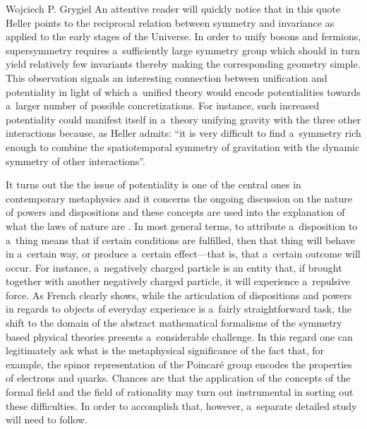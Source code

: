 \begin{artengenv}{Wojciech P. Grygiel}
An attentive reader will quickly notice that in this quote Heller points to the reciprocal relation between symmetry and invariance as applied to the early stages of the Universe. In order to unify bosons and fermions, supersymmetry requires a~sufficiently large symmetry group which should in turn yield relatively few invariants thereby making the corresponding geometry simple. This observation signals an interesting connection between unification and potentiality in light of which a~unified theory would encode potentialities towards a~larger number of possible concretizations. For instance, such increased potentiality could manifest itself in a~theory unifying gravity with the three other interactions because, as Heller 
\parencite*[][p.63]{heller_poczatek_2002} %
 admits: ``it is very difficult to find a~symmetry rich enough to combine the spatiotemporal symmetry of gravitation with the dynamic symmetry of other interactions''.



It turns out the the issue of potentiality is one of the central ones in contemporary metaphysics and it concerns the ongoing discussion on the nature of powers and dispositions and these concepts are used into the explanation of what the laws of nature are 
\parencite[e.g.,][]{friend_dispositions_2023}. %
 In most general terms, to attribute a~disposition to a~thing means that if certain conditions are fulfilled, then that thing will behave in a~certain way, or produce a~certain effect---that is, that a~certain outcome will occur. For instance, a~negatively charged particle is an entity that, if brought together with another negatively charged particle, it will experience a~repulsive force. As French 
\parencite*[][]{french_doing_2020} %
 clearly shows, while the articulation of dispositions and powers in regards to objects of everyday experience is a~fairly straightforward task, the shift to the domain of the abstract mathematical formalisms of the symmetry based physical theories presents a~considerable challenge. In this regard one can legitimately ask what is the metaphysical significance of the fact that, for example, the spinor representation of the Poincaré group encodes the properties of electrons and quarks. Chances are that the application of the concepts of the formal field and the field of rationality may turn out instrumental in sorting out these difficulties. In order to accomplish that, however, a~separate detailed study will need to follow.




\end{artengenv}
